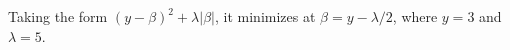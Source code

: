 \documentclass[10pt]{article}
\begin{document}
Taking the form $(y - \beta)^2 + \lambda | \beta |$, it minimizes at $\beta = y - \lambda / 2$, where $y = 3$  and  $\lambda = 5$.
\end{document}
